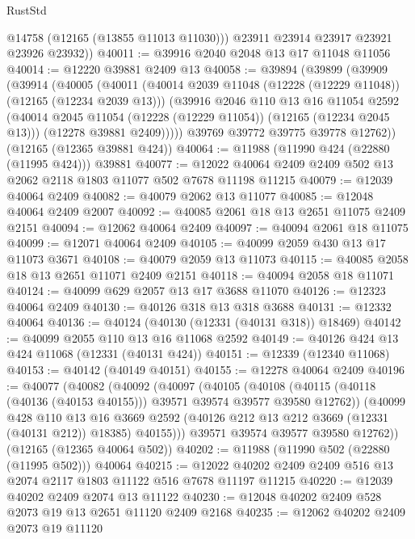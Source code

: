 \begin{lexlean}{RustStd}
\begin{coremodule}
          @14758
          (@12165 (@13855 @11013 @11030)))
        @23911
        @23914
        @23917
        @23921
        @23926
        @23932))
@40011 := @39916 @2040 @2048 @13 @17 @11048 @11056
@40014 := @12220 @39881 @2409 @13
@40058 := @39894
    (@39899
      (@39909
        (@39914
          (@40005
            (@40011
              (@40014 @2039 @11048 (@12228 (@12229 @11048)) (@12165 (@12234 @2039 @13)))
              (@39916
                @2046
                @110
                @13
                @16
                @11054
                @2592
                (@40014 @2045 @11054 (@12228 (@12229 @11054)) (@12165 (@12234 @2045 @13)))
                (@12278 @39881 @2409)))))
        @39769
        @39772
        @39775
        @39778
        @12762))
    (@12165 (@12365 @39881 @424))
@40064 := @11988 (@11990 @424 (@22880 (@11995 @424))) @39881
@40077 := @12022 @40064 @2409 @2409 @502 @13 @2062 @2118 @1803 @11077 @502 @7678 @11198 @11215
@40079 := @12039 @40064 @2409
@40082 := @40079 @2062 @13 @11077
@40085 := @12048 @40064 @2409 @2007
@40092 := @40085 @2061 @18 @13 @2651 @11075 @2409 @2151
@40094 := @12062 @40064 @2409
@40097 := @40094 @2061 @18 @11075
@40099 := @12071 @40064 @2409
@40105 := @40099 @2059 @430 @13 @17 @11073 @3671
@40108 := @40079 @2059 @13 @11073
@40115 := @40085 @2058 @18 @13 @2651 @11071 @2409 @2151
@40118 := @40094 @2058 @18 @11071
@40124 := @40099 @629 @2057 @13 @17 @3688 @11070
@40126 := @12323 @40064 @2409
@40130 := @40126 @318 @13 @318 @3688
@40131 := @12332 @40064
@40136 := @40124 (@40130 (@12331 (@40131 @318)) @18469)
@40142 := @40099 @2055 @110 @13 @16 @11068 @2592
@40149 := @40126 @424 @13 @424 @11068 (@12331 (@40131 @424))
@40151 := @12339 (@12340 @11068)
@40153 := @40142 (@40149 @40151)
@40155 := @12278 @40064 @2409
@40196 := @40077
    (@40082
      (@40092
        (@40097
          (@40105
            (@40108 (@40115 (@40118 (@40136 (@40153 @40155))) @39571 @39574 @39577 @39580 @12762))
            (@40099
              @428
              @110
              @13
              @16
              @3669
              @2592
              (@40126 @212 @13 @212 @3669 (@12331 (@40131 @212)) @18385)
              @40155)))
        @39571
        @39574
        @39577
        @39580
        @12762))
    (@12165 (@12365 @40064 @502))
@40202 := @11988 (@11990 @502 (@22880 (@11995 @502))) @40064
@40215 := @12022 @40202 @2409 @2409 @516 @13 @2074 @2117 @1803 @11122 @516 @7678 @11197 @11215
@40220 := @12039 @40202 @2409 @2074 @13 @11122
@40230 := @12048 @40202 @2409 @528 @2073 @19 @13 @2651 @11120 @2409 @2168
@40235 := @12062 @40202 @2409 @2073 @19 @11120

\end{coremodule}
\end{lexlean}
